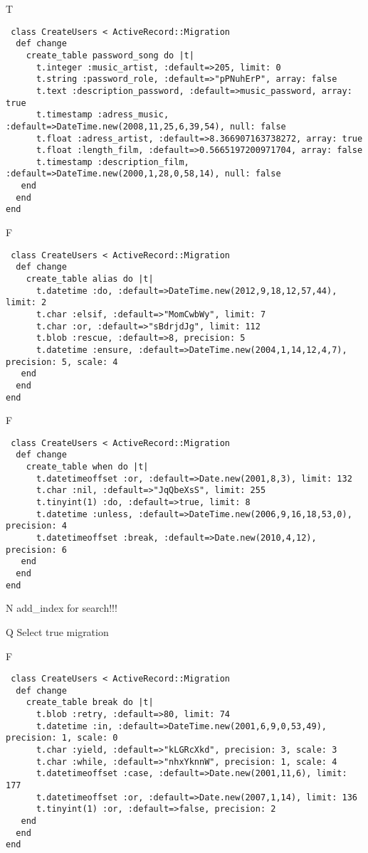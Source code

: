 T
\begin{verbatim}
 class CreateUsers < ActiveRecord::Migration 
  def change 
    create_table password_song do |t| 
      t.integer :music_artist, :default=>205, limit: 0
      t.string :password_role, :default=>"pPNuhErP", array: false
      t.text :description_password, :default=>music_password, array: true
      t.timestamp :adress_music, :default=>DateTime.new(2008,11,25,6,39,54), null: false
      t.float :adress_artist, :default=>8.366907163738272, array: true
      t.float :length_film, :default=>0.5665197200971704, array: false
      t.timestamp :description_film, :default=>DateTime.new(2000,1,28,0,58,14), null: false
   end 
  end 
end
\end{verbatim}

F
\begin{verbatim}
 class CreateUsers < ActiveRecord::Migration 
  def change 
    create_table alias do |t| 
      t.datetime :do, :default=>DateTime.new(2012,9,18,12,57,44), limit: 2
      t.char :elsif, :default=>"MomCwbWy", limit: 7
      t.char :or, :default=>"sBdrjdJg", limit: 112
      t.blob :rescue, :default=>8, precision: 5
      t.datetime :ensure, :default=>DateTime.new(2004,1,14,12,4,7), precision: 5, scale: 4
   end 
  end 
end
\end{verbatim}

F
\begin{verbatim}
 class CreateUsers < ActiveRecord::Migration 
  def change 
    create_table when do |t| 
      t.datetimeoffset :or, :default=>Date.new(2001,8,3), limit: 132
      t.char :nil, :default=>"JqQbeXsS", limit: 255
      t.tinyint(1) :do, :default=>true, limit: 8
      t.datetime :unless, :default=>DateTime.new(2006,9,16,18,53,0), precision: 4
      t.datetimeoffset :break, :default=>Date.new(2010,4,12), precision: 6
   end 
  end 
end
\end{verbatim}
N
add_index for search!!!
  
Q
Select true migration

F
\begin{verbatim}
 class CreateUsers < ActiveRecord::Migration 
  def change 
    create_table break do |t| 
      t.blob :retry, :default=>80, limit: 74
      t.datetime :in, :default=>DateTime.new(2001,6,9,0,53,49), precision: 1, scale: 0
      t.char :yield, :default=>"kLGRcXkd", precision: 3, scale: 3
      t.char :while, :default=>"nhxYknnW", precision: 1, scale: 4
      t.datetimeoffset :case, :default=>Date.new(2001,11,6), limit: 177
      t.datetimeoffset :or, :default=>Date.new(2007,1,14), limit: 136
      t.tinyint(1) :or, :default=>false, precision: 2
   end 
  end 
end
\end{verbatim}

